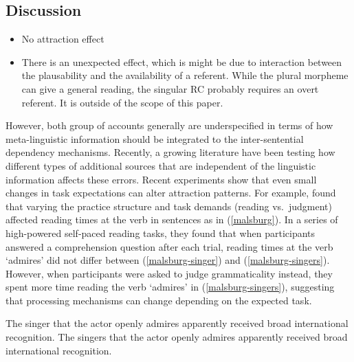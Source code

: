 \documentclass[
  authoryear,
  3p]{elsarticle}
\providecommand{\tightlist}{%
  \setlength{\itemsep}{0pt}\setlength{\parskip}{0pt}}
\begin{document}
\subsection{Discussion}\label{discussion}

\begin{itemize}
\tightlist
\item
  No attraction effect
\item
  There is an unexpected effect, which is might be due to interaction
  between the plausability and the availability of a referent. While the
  plural morpheme can give a general reading, the singular RC probably
  requires an overt referent. It is outside of the scope of this paper.
\end{itemize}

However, both group of accounts generally are underspecified in terms of
how meta-linguistic information should be integrated to the
inter-sentential dependency mechanisms. Recently, a growing literature
have been testing how different types of additional sources that are
independent of the linguistic information affects these errors. Recent
experiments show that even small changes in task expectations can alter
attraction patterns. For example, \citet{LauraMalsbug24} found that
varying the practice structure and task demands (reading vs.~judgment)
affected reading times at the verb in sentences as in (\ref{malsburg}).
In a series of high-powered self-paced reading tasks, they found that
when participants answered a comprehension question after each trial,
reading times at the verb `admires' did not differ between
(\ref{malsburg-singer}) and (\ref{malsburg-singers}). However, when
participants were asked to judge grammaticality instead, they spent more
time reading the verb `admires' in (\ref{malsburg-singers}), suggesting
that processing mechanisms can change depending on the expected task.

\begin{exe}
\ex \label{malsburg}
\begin{xlist}
\ex \label{malsburg-singer} The singer that the actor openly admires apparently received broad international recognition.
\ex \label{malsburg-singers} The singers that the actor openly admires apparently received broad international recognition.
\end{xlist}
\end{exe}
\end{document}
